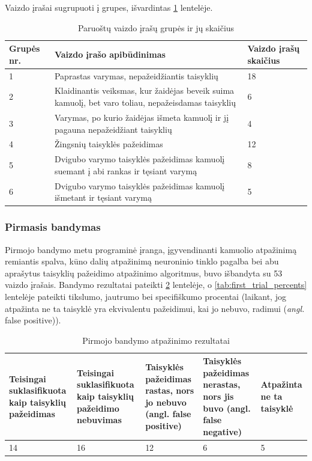 \documentclass{VUMIFPSbakalaurinis}
\begin{document}
Vaizdo įrašai sugrupuoti į grupes, išvardintas \ref{tab:video_groups} lentelėje.

\begin{table}[H]\footnotesize
	\centering
	\caption{Paruoštų vaizdo įrašų grupės ir jų skaičius}
	{\begin{tabular}{|p{3cm}|p{6cm}|p{3cm}|} \hline
			\textbf{Grupės nr.} & \textbf{Vaizdo įrašo apibūdinimas}  & \textbf{Vaizdo įrašų skaičius} \\
			\hline
			1  & Paprastas varymas, nepažeidžiantis taisyklių & 18 \\
			\hline
			2  & Klaidinantis veiksmas, kur žaidėjas beveik suima kamuolį, bet varo toliau, nepažeisdamas taisyklių & 6 \\
			\hline
			3  & Varymas, po kurio žaidėjas išmeta kamuolį ir jį pagauna nepažeidžiant taisyklių & 4 \\
			\hline
			4  & Žingsnių taisyklės pažeidimas & 12 \\
			\hline
			5  & Dvigubo varymo taisyklės pažeidimas kamuolį suemant į abi rankas ir tęsiant varymą & 8 \\
			\hline
			6  & Dvigubo varymo taisyklės pažeidimas kamuolį išmetant ir tęsiant varymą & 5 \\
			\hline
	\end{tabular}}
	\label{tab:video_groups}
\end{table}

\subsubsection{Pirmasis bandymas}

Pirmojo bandymo metu programinė įranga, įgyvendinanti kamuolio atpažinimą remiantis spalva, kūno dalių atpažinimą neuroninio tinklo pagalba bei abu aprašytus taisyklių pažeidimo atpažinimo algoritmus, buvo išbandyta su 53 vaizdo įrašais. Bandymo rezultatai pateikti \ref{tab:first_trial} lentelėje, o \ref{tab:first_trial_percents} lentelėje pateikti tikslumo, jautrumo bei specifiškumo procentai (laikant, jog atpažinta ne ta taisyklė yra ekvivalentu pažeidimui, kai jo nebuvo, radimui (\textit{angl.} false positive)). 

 \begin{table}[H]\footnotesize
 	\centering
 	\caption{Pirmojo bandymo atpažinimo rezultatai}
 	{\begin{tabular}{|p{3cm}|p{3cm}|p{3cm}|p{3cm}|p{2cm}|} \hline
 			\textbf{Teisingai suklasifikuota kaip taisyklių pažeidimas} & \textbf{Teisingai suklasifikuota kaip taisyklių pažeidimo nebuvimas} & \textbf{Taisyklės pažeidimas rastas, nors jo nebuvo (angl. false positive)} & \textbf{Taisyklės pažeidimas nerastas, nors jis buvo (angl. false negative)} & \textbf{Atpažinta ne ta taisyklė} \\
 			\hline
 			14  & 16    & 12    & 6    & 5   \\

 			\hline
 	\end{tabular}}
 	\label{tab:first_trial}
 \end{table}
\end{document}
